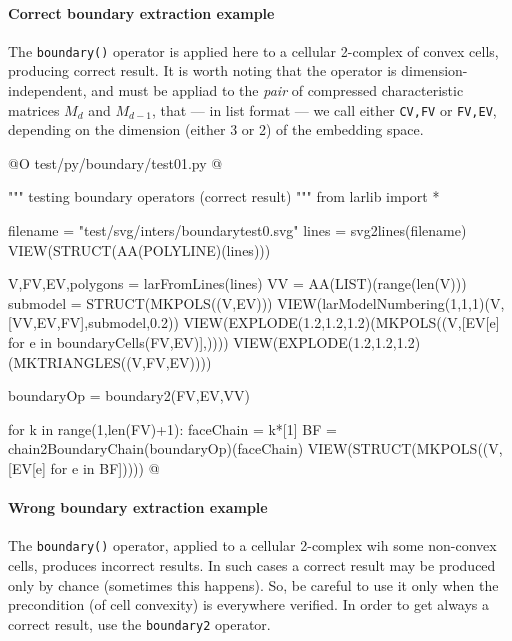 \documentclass[11pt,oneside]{article}	%
\begin{document}
\paragraph{Correct boundary extraction example}

The \texttt{boundary()} operator is applied here to a cellular 2-complex of convex cells, producing correct result. It is worth noting that the operator is dimension-independent, and must be appliad to the \emph{pair} of compressed characteristic matrices $M_d$ and $M_{d-1}$, that --- in list format --- we call either \texttt{CV,FV} or  \texttt{FV,EV}, depending on the dimension (either 3 or 2) of the embedding space.

@O test/py/boundary/test01.py
@{""" testing boundary operators (correct result) """
from larlib import *

filename = "test/svg/inters/boundarytest0.svg"
lines = svg2lines(filename)
VIEW(STRUCT(AA(POLYLINE)(lines)))
    
V,FV,EV,polygons = larFromLines(lines)
VV = AA(LIST)(range(len(V)))
submodel = STRUCT(MKPOLS((V,EV)))
VIEW(larModelNumbering(1,1,1)(V,[VV,EV,FV],submodel,0.2))
VIEW(EXPLODE(1.2,1.2,1.2)(MKPOLS((V,[EV[e] for e in boundaryCells(FV,EV)],))))
VIEW(EXPLODE(1.2,1.2,1.2)(MKTRIANGLES((V,FV,EV))))

boundaryOp = boundary2(FV,EV,VV)

for k in range(1,len(FV)+1):
    faceChain = k*[1]
    BF = chain2BoundaryChain(boundaryOp)(faceChain)
    VIEW(STRUCT(MKPOLS((V,[EV[e] for e in BF]))))
@}

\paragraph{Wrong boundary extraction example}

The \texttt{boundary()} operator, applied  to a cellular 2-complex wih some non-convex cells, produces incorrect results. In such cases a correct result may be produced only by chance (sometimes this happens). So, be careful to use it only when the precondition (of cell convexity) is everywhere verified. In order to get always a correct result, use the \texttt{boundary2} operator.
\end{document}
